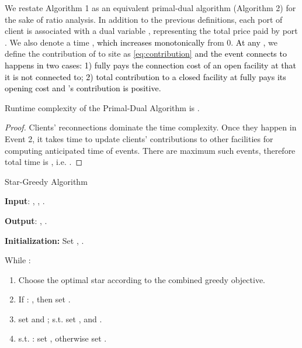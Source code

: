 \documentclass[10pt]{llncs}
\begin{document}
We restate Algorithm 1 as an equivalent primal-dual algorithm (Algorithm
2) for the sake of ratio analysis. In addition to the previous definitions,
each port  of client  is associated with
a dual variable , representing the total price paid
by port . We also denote a time\textcolor{black}{{}
}, \textcolor{black}{which increases monotonically} from 0.\textcolor{black}{{}
At any , }we define the contribution of  to site  as\textcolor{black}{{}
\eqref{eq:contribution} and the event  connects to  happens
in two cases: 1)  fully pays the connection cost of an open facility
at  that it is not connected to; 2) total contribution to a closed
facility at  fully pays its opening cost and 's contribution
is positive.}{\footnotesize 
}{\footnotesize \par}
\begin{lemma}
Runtime complexity of the Primal-Dual Algorithm is .\end{lemma}
\begin{proof}
Clients' reconnections dominate the time complexity. Once they happen
in Event 2, it takes time  to update clients'
contributions to other facilities for computing anticipated time of
events. There are maximum  such events, therefore
total time is , i.e. .
\end{proof}
\begin{algorithm}[H]
{\footnotesize \caption{Star-Greedy Algorithm}
}{\footnotesize \par}

\textbf{Input}: , , .

\textbf{Output}: , .

\textbf{Initialization:} Set , .

\medskip{}


While :
\begin{enumerate}
\item Choose the optimal star  according to the combined
greedy objective.
\item If : , then set .
\item  set 
and ; 
s.t. 
set ,
 and .
\item  s.t. : set \textbf{},
otherwise set .
\end{enumerate}
\end{algorithm}
\end{document}
